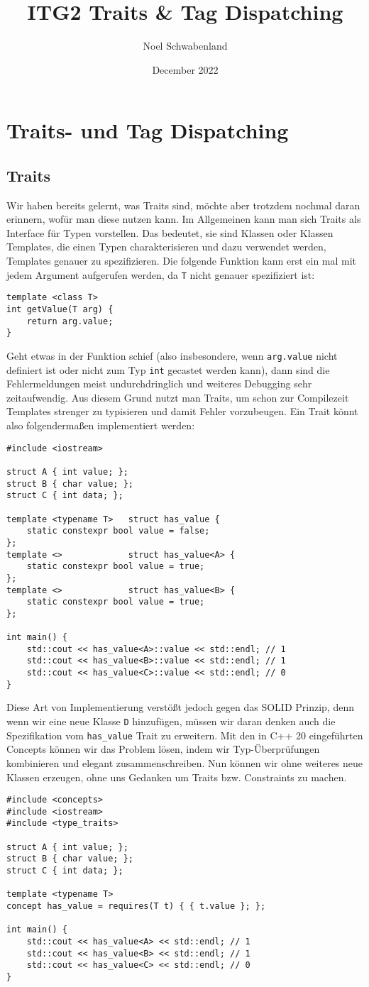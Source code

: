 \documentclass{article}
\title{ITG2 Traits \& Tag Dispatching}
\author{Noel Schwabenland}
\date{December 2022}
\begin{document}
\section{Traits- und Tag Dispatching}
\subsection*{Traits}
Wir haben bereits gelernt, was Traits sind, möchte aber trotzdem nochmal daran erinnern, wofür man diese nutzen kann. Im Allgemeinen kann man sich Traits als Interface für Typen vorstellen. Das bedeutet, sie sind Klassen oder Klassen Templates, die einen Typen charakterisieren und dazu verwendet werden, Templates genauer zu spezifizieren.
Die folgende Funktion kann erst ein mal mit jedem Argument aufgerufen werden, da \verb"T" nicht genauer spezifiziert ist:
\begin{verbatim}
template <class T> 
int getValue(T arg) {
    return arg.value;
}
\end{verbatim}
Geht etwas in der Funktion schief (also insbesondere, wenn \verb"arg.value" nicht definiert ist oder nicht zum  Typ \verb"int" gecastet werden kann), dann sind die Fehlermeldungen meist undurchdringlich und weiteres Debugging sehr zeitaufwendig. Aus diesem Grund nutzt man Traits, um schon zur Compilezeit Templates strenger zu typisieren und damit Fehler vorzubeugen.
Ein Trait könnt also folgendermaßen implementiert werden:
\begin{verbatim}
#include <iostream>

struct A { int value; };
struct B { char value; };
struct C { int data; };

template <typename T>   struct has_value {
    static constexpr bool value = false;
};
template <>             struct has_value<A> {
    static constexpr bool value = true;
};
template <>             struct has_value<B> {
    static constexpr bool value = true;
};

int main() {
    std::cout << has_value<A>::value << std::endl; // 1
    std::cout << has_value<B>::value << std::endl; // 1
    std::cout << has_value<C>::value << std::endl; // 0
}
\end{verbatim}
Diese Art von Implementierung verstößt jedoch gegen das SOLID Prinzip, denn wenn wir eine neue Klasse \verb"D" hinzufügen, müssen wir daran denken auch die Spezifikation vom \verb"has_value" Trait zu erweitern. Mit den in C++ 20 eingeführten Concepts können wir das Problem lösen, indem wir Typ-Überprüfungen kombinieren und elegant zusammenschreiben. Nun können wir ohne weiteres neue Klassen erzeugen, ohne uns Gedanken um Traits bzw. Constraints zu machen.
\begin{verbatim}
#include <concepts>
#include <iostream>
#include <type_traits>

struct A { int value; };
struct B { char value; };
struct C { int data; };

template <typename T>
concept has_value = requires(T t) { { t.value }; };

int main() {
    std::cout << has_value<A> << std::endl; // 1
    std::cout << has_value<B> << std::endl; // 1
    std::cout << has_value<C> << std::endl; // 0
}
\end{verbatim}
\end{document}
